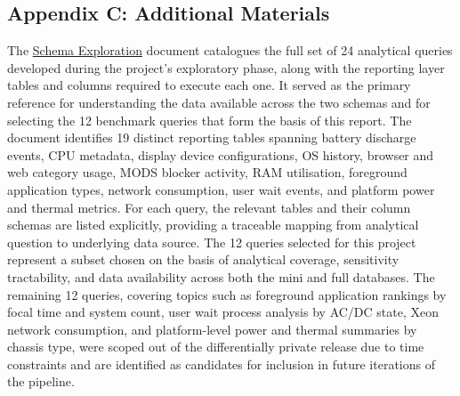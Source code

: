 \documentclass[12pt,letterpaper]{article}
\begin{document}
\subsection{Appendix C: Additional Materials}

The \href{https://docs.google.com/document/d/1XfkwK9zN7aP9EJ5fI-bRJ5eS9TzQZW_oRQ9NwRilQeo/edit?usp=sharing}{Schema Exploration} document catalogues the full set of 24 analytical queries developed during the project's exploratory phase, along with the reporting layer tables and columns required to execute each one. It served as the primary reference for understanding the data available across the two schemas and for selecting the 12 benchmark queries that form the basis of this report. The document identifies 19 distinct reporting tables spanning battery discharge events, CPU metadata, display device configurations, OS history, browser and web category usage, MODS blocker activity, RAM utilisation, foreground application types, network consumption, user wait events, and platform power and thermal metrics. For each query, the relevant tables and their column schemas are listed explicitly, providing a traceable mapping from analytical question to underlying data source. The 12 queries selected for this project represent a subset chosen on the basis of analytical coverage, sensitivity tractability, and data availability across both the mini and full databases. The remaining 12 queries, covering topics such as foreground application rankings by focal time and system count, user wait process analysis by AC/DC state, Xeon network consumption, and platform-level power and thermal summaries by chassis type, were scoped out of the differentially private release due to time constraints and are identified as candidates for inclusion in future iterations of the pipeline.
\end{document}
